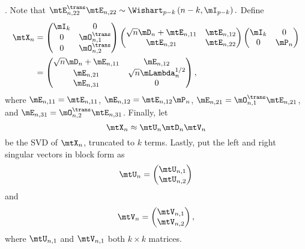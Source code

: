 \)
.  Note that 
\(
    \mtE_{n,22}^\trans \mtE_{n,22}
    \sim
    \Wishart_{p-k} \left( n-k, \mI_{p-k} \right).
\)
Define
\begin{align*}
    \mtX_n
        &=
            \left(
            \begin{matrix}
                \mI_k & 0 \\
                0  & \mO_{n,1}^\trans \\
                0  & \mO_{n,2}^\trans
            \end{matrix}
            \right)
            \left(
            \begin{matrix}
                \sqrt{n} \mD_n + \mtE_{n,11} & \mtE_{n,12} \\
                \mtE_{n,21}                  & \mtE_{n,22}
            \end{matrix}
            \right)
            \left(
            \begin{matrix}
                \mI_k & 0 \\
                0     & \mP_n
            \end{matrix}
            \right) \\
        &=
            \left(
            \begin{matrix}
                \sqrt{n} \mD_n + \mE_{n,11} & \mE_{n,12} \\
                \mE_{n,21}                  & \sqrt{n} \mLambda^{1/2}_n \\
                \mE_{n,31}                  & 0
            \end{matrix}
            \right),
\end{align*}
where 
$\mE_{n,11} = \mtE_{n,11}$, 
$\mE_{n,12} = \mtE_{n,12} \mP_n$,
$\mE_{n,21} = \mO_{n,1}^\trans \mtE_{n,21}$, and
$\mE_{n,31} = \mO_{n,2}^\trans \mtE_{n,31}$.
Finally, let
\[
    \mtX_n
    \approx
    \mtU_n \mtD_n \mtV_n
\]
be the SVD of $\mtX_n$, truncated to $k$ terms.  Lastly, put the left and right singular vectors in block form as
\[
    \mtU_n
    =
    \left(
    \begin{matrix}
        \mtU_{n,1} \\
        \mtU_{n,2}
    \end{matrix}
    \right)
\]
and
\[
    \mtV_n
    =
    \left(
    \begin{matrix}
        \mtV_{n,1} \\
        \mtV_{n,2}
    \end{matrix}
    \right),
\]
where $\mtU_{n,1}$ and $\mtV_{n,1}$ both $k\times k$ matrices.

